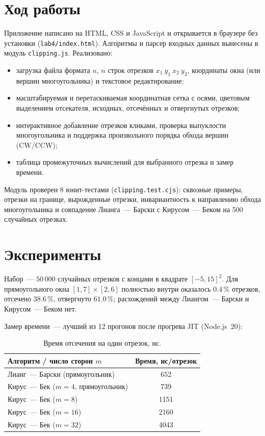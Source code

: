 \documentclass[11pt,a4paper]{article}
\begin{document}
\section{Ход работы}
Приложение написано на HTML, CSS и JavaScript и открывается в браузере без
установки (\texttt{lab4/index.html}). Алгоритмы и парсер входных данных вынесены
в модуль \texttt{clipping.js}. Реализовано:
\begin{itemize}[label=--, leftmargin=1.5em, itemsep=0.1em, topsep=0.2em]
  \item загрузка файла формата $n$, $n$ строк отрезков $x_1\ y_1\ x_2\ y_2$,
        координаты окна (или вершин многоугольника) и текстовое редактирование;
  \item масштабируемая и перетаскиваемая координатная сетка с осями, цветовым
        выделением отсекателя, исходных, отсечённых и отвергнутых отрезков;
  \item интерактивное добавление отрезков кликами, проверка выпуклости
        многоугольника и поддержка произвольного порядка обхода вершин (CW/CCW);
  \item таблица промежуточных вычислений для выбранного отрезка и замер времени.
\end{itemize}
Модуль проверен 8 юнит-тестами (\texttt{clipping.test.cjs}): сквозные примеры,
отрезки на границе, вырожденные отрезки, инвариантность к направлению обхода
многоугольника и совпадение Лианга~— Барски с Кирусом~— Беком на 500 случайных
отрезках.

\section{Эксперименты}
Набор~— $50\,000$ случайных отрезков с концами в квадрате $[-5, 15]^2$.
Для прямоугольного окна $[1, 7] \times [2, 6]$ полностью внутри оказалось
$0.4\,\%$ отрезков, отсечено $38.6\,\%$, отвергнуто $61.0\,\%$; расхождений между
Лиангом~— Барски и Кирусом~— Беком нет.

Замер времени~— лучший из 12 прогонов после прогрева JIT (Node.js~20):

\begin{table}[H]
\centering\small
\caption{Время отсечения на один отрезок, нс.}
\begin{tabular}{lc}
\toprule
Алгоритм / число сторон $m$ & Время, нс/отрезок \\
\midrule
Лианг~— Барски (прямоугольник) & 652 \\
Кирус~— Бек ($m = 4$, прямоугольник) & 739 \\
Кирус~— Бек ($m = 8$) & 1151 \\
Кирус~— Бек ($m = 16$) & 2160 \\
Кирус~— Бек ($m = 32$) & 4043 \\
\bottomrule
\end{tabular}
\end{table}
\end{document}
